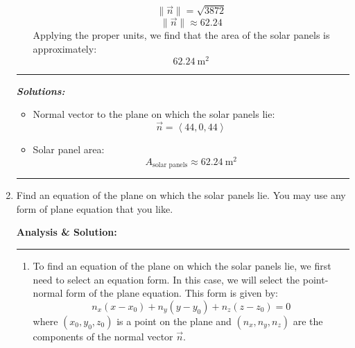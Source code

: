 \documentclass[12pt]{article} %
\numberwithin{equation}{section}
\begin{document}
\begin{enumerate}[label=\roman*.]
\begin{enumerate}[label=\arabic*.]
\[                    \lVert \vec{n} \rVert = \sqrt{3872}
                    \]
                    \[
                    \lVert \vec{n} \rVert \approx 62.24
                    \]
                    Applying the proper units, we find that the area of the solar panels is approximately:
                    \[
                    \boxed{\SI{62.24}{\meter^2}}
                    \]
            \end{enumerate}
\pagebreak[3]
            \begin{center}
            \rule{\linewidth}{0.1pt}
            \end{center}
            \hspace{0.5em}
            \textbf{\textit{Solutions:}}
            \begin{itemize}
                \item Normal vector to the plane on which the solar panels lie:
                    \[
                    \boxed{\vec{n} = \left\langle 44, 0, 44 \right\rangle}
                    \]
                \item Solar panel area:
                    \[
                    \boxed{A_{\text{solar panels}}\approx \SI{62.24}{\meter^2}}
                    \]
            \end{itemize}
            \begin{center}
            \rule{\linewidth}{1pt}
            \end{center}
\pagebreak[3]
        \item Find an equation of the plane on which the solar panels lie.
            You may use any form of plane equation that you like.\par
            \bigskip
            \hspace{0.5em}
            \textbf{Analysis \& Solution:}
            \begin{center}
            \rule{\linewidth}{1pt}
            \end{center}
            \begin{enumerate}[label=\arabic*.]
                \item To find an equation of the plane on which the solar panels lie, we first need to select an equation form.
                    In this case, we will select the point-normal form of the plane equation.
                    This form is given by:
                    \[
                    n_x(x - x_0) + n_y(y - y_0) + n_z(z - z_0) = 0
                    \]
                    where \((x_0, y_0, z_0)\) is a point on the plane and \((n_x, n_y, n_z)\) are the components of the normal vector \(\vec{n}\).

\end{enumerate}
\end{enumerate}
\end{document}
